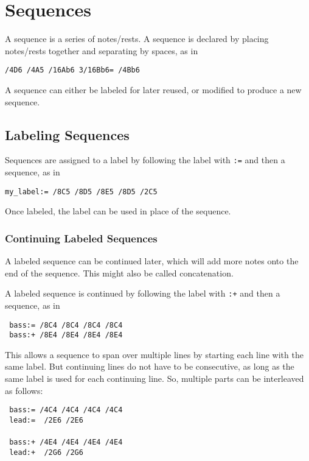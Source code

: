 \documentclass{scrartcl}
\begin{document}
\section{Sequences}
A sequence is a series of notes/rests. A sequence is declared by placing notes/rests together and separating by spaces, as in 
\begin{center}
\verb|/4D6 /4A5 /16Ab6 3/16Bb6= /4Bb6|
\end{center}

A sequence can either be labeled for later reused, or modified to produce a new sequence.

\subsection{Labeling Sequences}
Sequences are assigned to a label by following the label with \verb|:=| and then a sequence, as in
\begin{center}
\verb|my_label:= /8C5 /8D5 /8E5 /8D5 /2C5|
\end{center}

Once labeled, the label can be used in place of the sequence. 

\subsubsection{Continuing Labeled Sequences}
A labeled sequence can be continued later, which will add more notes onto the end of the sequence. This might also be called concatenation.

A labeled sequence is continued by following the label with \verb|:+| and then a sequence, as in
\begin{tabbing}
  \hspace{1in}\= \verb| bass:= /8C4 /8C4 /8C4 /8C4| \\
  \> \verb| bass:+ /8E4 /8E4 /8E4 /8E4|
\end{tabbing}

This allows a sequence to span over multiple lines by starting each line with the same label. But continuing lines do not have to be consecutive, as long as the same label is used for each continuing line. So, multiple parts can be interleaved as follows:
\begin{tabbing}
  \hspace{1in}\= \verb| bass:= /4C4 /4C4 /4C4 /4C4| \\
  \> \verb| lead:=  /2E6 /2E6| \\
  \> ~\\
  \> \verb| bass:+ /4E4 /4E4 /4E4 /4E4| \\
  \> \verb| lead:+  /2G6 /2G6| \\
\end{tabbing}
\end{document}
